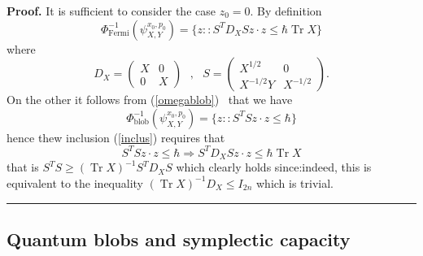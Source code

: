 \documentclass[11pt]{article}%
\newenvironment{proof}[1][Proof]{\noindent\textbf{#1.} }{\ \rule{0.5em}{0.5em}}
\begin{document}
\begin{proof}
It is sufficient to consider the case $z_{0}=0.$ By definition%
\[
\Phi_{\mathrm{\operatorname{Fermi}}}^{-1}(\psi_{X,Y}^{x_{0},p_{0}}%
)=\{z::S^{T}D_{X}Sz\cdot z\leq\hbar\operatorname*{Tr}X\}
\]
where
\begin{equation}
D_{X}=%
\begin{pmatrix}
X & 0\\
0 & X
\end{pmatrix}
\text{ \ },\text{ \ }S=%
\begin{pmatrix}
X^{1/2} & 0\\
X^{-1/2}Y & X^{-1/2}%
\end{pmatrix}
.
\end{equation}
On the other it follows from (\ref{omegablob}) \ that we have%
\[
\Phi_{\mathrm{blob}}^{-1}(\psi_{X,Y}^{x_{0},p_{0}})=\{z::S^{T}Sz\cdot
z\leq\hbar\}
\]
hence thew inclusion (\ref{inclus}) requires that
\[
S^{T}Sz\cdot z\leq\hbar\Longrightarrow S^{T}D_{X}Sz\cdot z\leq\hbar
\operatorname*{Tr}X
\]
that is $S^{T}S\geq(\operatorname*{Tr}X)^{-1}S^{T}D_{X}S$ which clearly holds
since:indeed, this is equivalent to the inequality $(\operatorname*{Tr}%
X)^{-1}D_{X}\leq I_{2n}$ which is trivial.
\end{proof}

\subsection{Quantum blobs and symplectic capacity}
\end{document}
